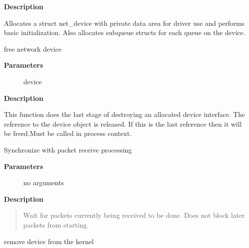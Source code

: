 \documentclass[a4paper,8pt,english]{sphinxmanual}
\begin{document}
\textbf{Description}

Allocates a struct net\_device with private data area for driver use
and performs basic initialization.  Also allocates subqueue structs
for each queue on the device.

\begin{fulllineitems}
\label{networking/kapi:c.free_netdev}
free network device

\end{fulllineitems}


\textbf{Parameters}
\begin{description}
\item[{}] \leavevmode
device

\end{description}

\textbf{Description}

This function does the last stage of destroying an allocated device
interface. The reference to the device object is released. If this
is the last reference then it will be freed.Must be called in process
context.

\begin{fulllineitems}
\label{networking/kapi:c.synchronize_net}
Synchronize with packet receive processing

\end{fulllineitems}


\textbf{Parameters}
\begin{description}
\item[{}] \leavevmode
no arguments

\end{description}

\textbf{Description}
\begin{quote}

Wait for packets currently being received to be done.
Does not block later packets from starting.
\end{quote}

\begin{fulllineitems}
\label{networking/kapi:c.unregister_netdevice_queue}
remove device from the kernel

\end{fulllineitems}
\end{document}

